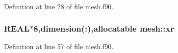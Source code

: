 Definition at line 28 of file mesh.f90.

\hypertarget{namespacemesh_a0351493d48c86a4a92f34aa94f8cc099}{
\subsubsection[{xr}]{\setlength{\rightskip}{0pt plus 5cm}REAL$\ast$8,dimension(:),allocatable {\bf mesh::xr}}}
\label{namespacemesh_a0351493d48c86a4a92f34aa94f8cc099}


Definition at line 57 of file mesh.f90.

